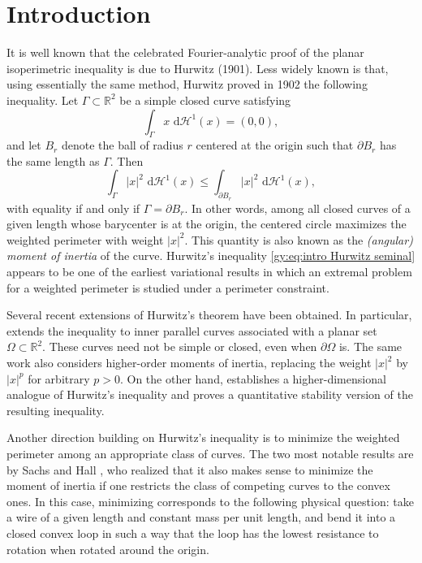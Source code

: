 \documentclass[10pt,leqno]{amsart}
\newcommand{\R}[0]{\mathbb{R}}
\newcommand{\dHo}{\, \mathrm{d} \mathcal{H}^{1}}
\numberwithin{Theorem}{section}
\theoremstyle{definition}
\theoremstyle{remark}
\numberwithin{equation}{section}
\numberwithin{equation}{section}
\begin{document}
\section{Introduction}

It is well known that the celebrated Fourier-analytic proof of the planar isoperimetric inequality is due to Hurwitz (1901). Less widely known is that, using essentially the same method, Hurwitz proved in 1902 \cite[pp.~396--397]{Hurwitz1902} the following inequality. Let $\Gamma\subset\R^2$ be a simple closed curve satisfying \begin{equation*} \int_{\Gamma} x \,\dHo(x) = (0,0), \end{equation*} and let $B_r$ denote the ball of radius $r$ centered at the origin such that $\partial B_r$ has the same length as $\Gamma$. Then \begin{equation}\label{gy:eq:intro Hurwitz seminal} \int_{\Gamma} |x|^2 \,\dHo(x) \leq \int_{\partial B_r} |x|^2 \,\dHo(x), \end{equation} with equality if and only if $\Gamma=\partial B_r$. In other words, among all closed curves of a given length whose barycenter is at the origin, the centered circle maximizes the weighted perimeter with weight $|x|^2$. This quantity is also known as the \emph{(angular) moment of inertia} of the curve. Hurwitz's inequality \eqref{gy:eq:intro Hurwitz seminal} appears to be one of the earliest variational results in which an extremal problem for a weighted perimeter is studied under a perimeter constraint. 

Several recent extensions of Hurwitz's theorem have been obtained. In particular, \cite{Charlotte2024} extends the inequality to inner parallel curves associated with a planar set $\Omega\subset\R^2$. These curves need not be simple or closed, even when $\partial\Omega$ is. The same work also considers higher-order moments of inertia, replacing the weight $|x|^2$ by $|x|^p$ for arbitrary $p>0$. On the other hand, \cite{LaMannaSannipoli} establishes a higher-dimensional analogue of Hurwitz's inequality and proves a quantitative stability version of the resulting inequality.



Another direction building on Hurwitz's inequality is to minimize the weighted perimeter among an appropriate class of curves. The two most notable results are by Sachs \cite{SachsIandII} and Hall \cite{Hall1985}, who realized that it also makes sense to minimize the moment of inertia if  one restricts the class of competing curves to the convex ones. In this case, minimizing  corresponds to the following physical question: take a wire of a given length and constant mass per unit length, and bend it into a closed convex loop in such a way that the loop has the lowest resistance to rotation when rotated around the origin.
\end{document}
